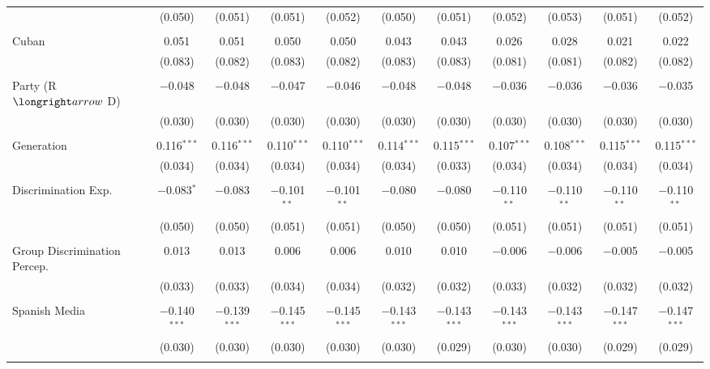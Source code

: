 \begin{table}[!htbp]
\begin{tabular}{@{\extracolsep{5pt}}lcccccccccc}
  & (0.050) & (0.051) & (0.051) & (0.052) & (0.050) & (0.051) & (0.052) & (0.053) & (0.051) & (0.052) \\ 
  & & & & & & & & & & \\ 
 Cuban & 0.051 & 0.051 & 0.050 & 0.050 & 0.043 & 0.043 & 0.026 & 0.028 & 0.021 & 0.022 \\ 
  & (0.083) & (0.082) & (0.083) & (0.082) & (0.083) & (0.083) & (0.081) & (0.081) & (0.082) & (0.082) \\ 
  & & & & & & & & & & \\ 
 Party (R $\longright arrow$ D) & $-$0.048 & $-$0.048 & $-$0.047 & $-$0.046 & $-$0.048 & $-$0.048 & $-$0.036 & $-$0.036 & $-$0.036 & $-$0.035 \\ 
  & (0.030) & (0.030) & (0.030) & (0.030) & (0.030) & (0.030) & (0.030) & (0.030) & (0.030) & (0.030) \\ 
  & & & & & & & & & & \\ 
 Generation & 0.116$^{***}$ & 0.116$^{***}$ & 0.110$^{***}$ & 0.110$^{***}$ & 0.114$^{***}$ & 0.115$^{***}$ & 0.107$^{***}$ & 0.108$^{***}$ & 0.115$^{***}$ & 0.115$^{***}$ \\ 
  & (0.034) & (0.034) & (0.034) & (0.034) & (0.034) & (0.033) & (0.034) & (0.034) & (0.034) & (0.034) \\ 
  & & & & & & & & & & \\ 
 Discrimination Exp. & $-$0.083$^{*}$ & $-$0.083 & $-$0.101$^{**}$ & $-$0.101$^{**}$ & $-$0.080 & $-$0.080 & $-$0.110$^{**}$ & $-$0.110$^{**}$ & $-$0.110$^{**}$ & $-$0.110$^{**}$ \\ 
  & (0.050) & (0.050) & (0.051) & (0.051) & (0.050) & (0.050) & (0.051) & (0.051) & (0.051) & (0.051) \\ 
  & & & & & & & & & & \\ 
 Group Discrimination Percep. & 0.013 & 0.013 & 0.006 & 0.006 & 0.010 & 0.010 & $-$0.006 & $-$0.006 & $-$0.005 & $-$0.005 \\ 
  & (0.033) & (0.033) & (0.034) & (0.034) & (0.032) & (0.032) & (0.033) & (0.032) & (0.032) & (0.032) \\ 
  & & & & & & & & & & \\ 
 Spanish Media & $-$0.140$^{***}$ & $-$0.139$^{***}$ & $-$0.145$^{***}$ & $-$0.145$^{***}$ & $-$0.143$^{***}$ & $-$0.143$^{***}$ & $-$0.143$^{***}$ & $-$0.143$^{***}$ & $-$0.147$^{***}$ & $-$0.147$^{***}$ \\ 
  & (0.030) & (0.030) & (0.030) & (0.030) & (0.030) & (0.029) & (0.030) & (0.030) & (0.029) & (0.029) \\ 
  & & & & & & & & & & \\ 

\end{tabular}
\end{table}
